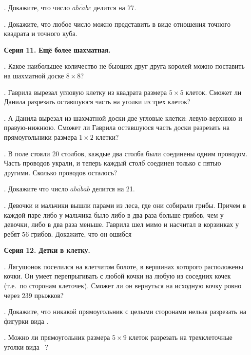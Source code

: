 .  Докажите, что число $\overline{abcabc}$ делится на 77.

.  Докажите, что любое число можно представить в виде отношения точного квадрата и точного куба.                          

\centerline{\bf Серия 11. Ещё более шахматная.}

. Какое наибольшее количество не бьющих друг друга королей
можно поставить на шахматной доске $8\times 8$?

.  Гаврила вырезал угловую клетку из квадрата размера $5\times 5$ клеток. Сможет ли Данила
разрезать оставшуюся часть на уголки из трех клеток?

. А Данила вырезал из шахматной доски 
две угловые клетки: левую-верхнюю и правую-нижнюю. Сможет  ли Гаврила оставшуюся часть доски разрезать на
прямоугольники размера $1\times 2$ клетки?

.  В поле стояли 20 столбов, каждые два столба были соединены
одним проводом. Часть проводов украли, и теперь каждый столб
соединен только с пятью другими. Сколько проводов осталось?

. Докажите что число $\overline{ababab}$ делится на 21.

. Девочки и мальчики вышли парами из леса, где они собирали грибы. 
Причем в каждой паре либо у мальчика было либо в два раза больше грибов,
чем у девочки, либо в два раза меньше. Гаврила шел мимо и насчитал в корзинках у ребят 56 грибов.
Докажите, что он ошибся


\centerline{\bf Серия 12.  Детки в клетку.}

.  Лягушонок поселился на клетчатом болоте, в вершинах которого расположены кочки.
Он умеет перепрыгивать с любой кочки на любую из соседних кочек (т.е.\ по сторонам клеточек).
Сможет ли он вернуться на исходную кочку ровно через 239 прыжков?

. Докажите, что никакой прямоугольник с целыми сторонами нельзя разрезать
на фигурки вида \cellsize\cells{
 __
|_|_|_
   |_|_|
}.


. Можно ли прямоугольник размера $5\times 9$ клеток
разрезать на трехклеточные уголки вида
\cellsize\cells{
 _
|_|_
|_|_|
}~?


